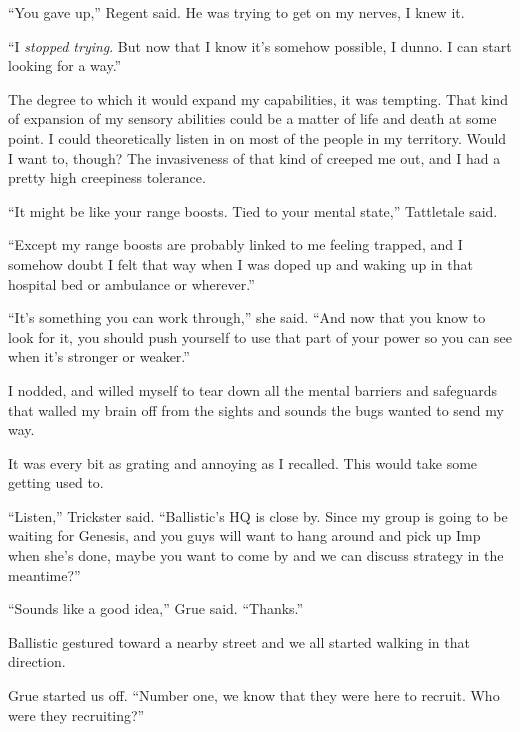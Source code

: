 ``You gave up,'' Regent said.  He was trying to get on my nerves, I knew it.



``I \emph{stopped trying}.  But now that I know it's somehow possible, I dunno.  I can start looking for a way.''



The degree to which it would expand my capabilities, it was tempting.  That kind of expansion of my sensory abilities could be a matter of life and death at some point.  I could theoretically listen in on most of the people in my territory.  Would I want to, though?  The invasiveness of that kind of creeped me out, and I had a pretty high creepiness tolerance.



``It might be like your range boosts.  Tied to your mental state,'' Tattletale said.



``Except my range boosts are probably linked to me feeling trapped, and I somehow doubt I felt that way when I was doped up and waking up in that hospital bed or ambulance or wherever.''



``It's something you can work through,'' she said.  ``And now that you know to look for it, you should push yourself to use that part of your power so you can see when it's stronger or weaker.''



I nodded, and willed myself to tear down all the mental barriers and safeguards that walled my brain off from the sights and sounds the bugs wanted to send my way.



It was every bit as grating and annoying as I recalled.  This would take some getting used to.



``Listen,'' Trickster said.  ``Ballistic's HQ is close by.  Since my group is going to be waiting for Genesis, and you guys will want to hang around and pick up Imp when she's done, maybe you want to come by and we can discuss strategy in the meantime?''



``Sounds like a good idea,'' Grue said.  ``Thanks.''



Ballistic gestured toward a nearby street and we all started walking in that direction.



Grue started us off.  ``Number one, we know that they were here to recruit.  Who were they recruiting?''



